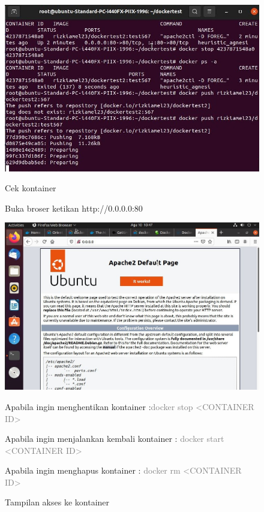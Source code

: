 \begin{figure}
    \begin{center}
        \includegraphics[width=\linewidth]{image/31.jpg}
        \caption{Cek kontainer}
        \label{fig:my_figure}
    \end{center}

Buka broser ketikan http://0.0.0.0:80
    \begin{center}
        \includegraphics[width=\linewidth]{image/34.jpg}
        \caption{Tampilan akses ke kontainer}
        \label{fig:my_figure}
    \end{center}

Apabila ingin menghentikan kontainer :\textcolor{Gray}{docker stop <CONTAINER ID>}

Apabila ingin menjalankan kembali kontainer : \textcolor{Gray}{docker start <CONTAINER ID>}

Apabila ingin menghapus kontainer : \textcolor{Gray}{docker rm <CONTAINER ID>}

\end{figure}